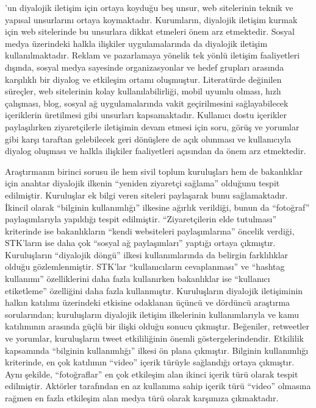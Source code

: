 \documentclass[
]{book}
\begin{document}
\citet{kent1998building}'un diyalojik iletişim için ortaya koyduğu beş unsur, web sitelerinin teknik ve yapısal unsurlarını ortaya koymaktadır. Kurumların, diyalojik iletişim kurmak için web sitelerinde bu unsurlara dikkat etmeleri önem arz etmektedir. Sosyal medya üzerindeki halkla ilişkiler uygulamalarında da diyalojik iletişim kullanılmaktadır. Reklam ve pazarlamaya yönelik tek yönlü iletişim faaliyetleri dışında, sosyal medya sayesinde organizasyonlar ve hedef grupları arasında karşılıklı bir diyalog ve etkileşim ortamı oluşmuştur. Literatürde değinilen süreçler, web sitelerinin kolay kullanılabilirliği, mobil uyumlu olması, hızlı çalışması, blog, sosyal ağ uygulamalarında vakit geçirilmesini sağlayabilecek içeriklerin üretilmesi gibi unsurları kapsamaktadır. Kullanıcı dostu içerikler paylaşılırken ziyaretçilerle iletişimin devam etmesi için soru, görüş ve yorumlar gibi karşı taraftan gelebilecek geri dönüşlere de açık olunması ve kullanıcıyla diyalog oluşması ve halkla ilişkiler faaliyetleri açısından da önem arz etmektedir.

Araştırmanın birinci sorusu ile hem sivil toplum kuruluşları hem de bakanlıklar için anahtar diyalojik ilkenin ``yeniden ziyaretçi sağlama'' olduğunu tespit edilmiştir. Kuruluşlar ek bilgi veren siteleri paylaşarak bunu sağlamaktadır. İkincil olarak ``bilginin kullanımlığı'' ilkesine ağırlık verildiği, bunun da ``fotoğraf'' paylaşımlarıyla yapıldığı tespit edilmiştir. ``Ziyaretçilerin elde tutulması'' kriterinde ise bakanlıkların ``kendi websiteleri paylaşımlarına'' öncelik verdiği, STK'ların ise daha çok ``sosyal ağ paylaşımları'' yaptığı ortaya çıkmıştır. Kuruluşların ``diyalojik döngü'' ilkesi kullanımlarında da belirgin farklılıklar olduğu gözlemlenmiştir. STK'lar ``kullanıcıların cevaplanması'' ve ``hashtag kullanımı'' özelliklerini daha fazla kullanırken bakanlıklar ise ``kullanıcı etiketleme'' özelliğini daha fazla kullanmıştır.
Kuruluşların diyalojik iletişiminin halkın katılımı üzerindeki etkisine odaklanan üçüncü ve dördüncü araştırma sorularından; kuruluşların diyalojik iletişim ilkelerinin kullanımlarıyla ve kamu katılımının arasında güçlü bir ilişki olduğu sonucu çıkmıştır. Beğeniler, retweetler ve yorumlar, kuruluşların tweet etkililiğinin önemli göstergelerindendir. Etkililik kapsamında ``bilginin kullanımlığı'' ilkesi ön plana çıkmıştır. Bilginin kullanımlığı kriterinde, en çok katılımın ``video'' içerik türüyle sağlandığı ortaya çıkmıştır. Aynı şekilde, ``fotoğraflar'' en çok etkileşim alan ikinci içerik türü olarak tespit edilmiştir. Aktörler tarafından en az kullanıma sahip içerik türü ``video'' olmasına rağmen en fazla etkileşim alan medya türü olarak karşımıza çıkmaktadır.
\end{document}
